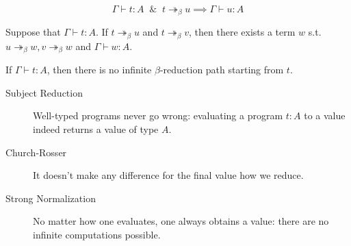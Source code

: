\documentclass[UTF8,aspectratio=43,11pt,colorlinks,compress,openany]{beamer}%
\begin{document}
\begin{frame}\frametitle{}
\setlength\abovedisplayskip{0pt}
\setlength\belowdisplayskip{0pt}
\begin{lemma}
\centerline{}
\end{lemma}\vspace*{-1ex}
\begin{theorem}
\[\Gamma\vdash t: A\;\;\&\;\;t\twoheadrightarrow_\beta u\implies\Gamma\vdash u: A\]
\end{theorem}\vspace*{-1ex}
\begin{theorem}
Suppose that $\Gamma\vdash t: A$. If $t\twoheadrightarrow_\beta u$ and $t\twoheadrightarrow_\beta v$, then there exists a term $w$ s.t. $u\twoheadrightarrow_\beta w, v\twoheadrightarrow_\beta w$ and $\Gamma\vdash w: A$.
\end{theorem}\vspace*{-1ex}
\begin{theorem}
If $\Gamma\vdash t: A$, then there is no infinite $\beta$-reduction path starting
from $t$.
\end{theorem}
{\small 
\begin{description}
\item[Subject Reduction]
Well-typed programs never go wrong: evaluating a program $t: A$ to a value indeed returns a value of type $A$.
\item[Church-Rosser] It doesn't make any difference for the final value how we reduce.
\item[Strong Normalization] No matter how one evaluates, one always obtains a value: there are no infinite computations possible.
\end{description}
}
\end{frame}
\end{document}
